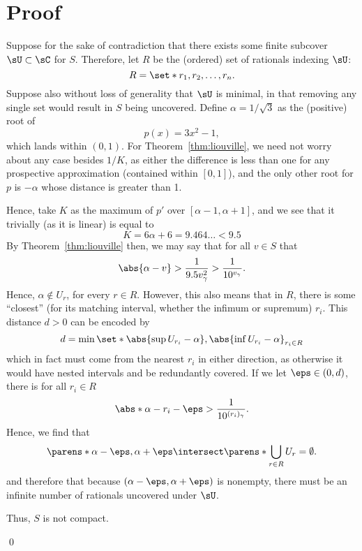 \documentclass{article}
\newcommand{\Rt}[1]{\dfrac{1}{10^{#1}}}
\begin{document}
\section{Proof}

Suppose for the sake of contradiction that there exists some finite subcover $\sU \subset \sC$ for $S$.
Therefore, let $R$ be the (ordered) set of rationals indexing $\sU$:
\[ R = \set*{r_{1}, r_{2}, \ldots, r_{n}}. \]
Suppose also without loss of generality that $\sU$ is minimal, in that removing any single set would result in $S$
being uncovered.
Define $\alpha = 1/\!\sqrt{3}$ as the (positive) root of
\[ p(x) = 3x^{2} - 1, \]
which lands within $(0, 1)$.
For Theorem~\ref{thm:liouville}, we need not worry about any case besides $1/K$, as
either the difference is less than one for any prospective approximation (contained within $[0, 1]$),
and the only other root for $p$ is $-\alpha$ whose distance is greater than 1.

Hence, take $K$ as the maximum of $p'$ over $[\alpha - 1, \alpha + 1]$, and we see that it trivially (as it is linear)
is equal to
\[ K = 6\alpha + 6 = 9.464\ldots < 9.5 \]
By Theorem~\ref{thm:liouville} then, we may say that for all $v \in S$ that
\[ \abs{\alpha - v} > \frac{1}{9.5v_{\gamma}^{2}} > \frac{1}{10^{v_{\gamma}}}. \]
Hence, $\alpha \notin U_{r}$, for every $r \in R$.
However, this also means that in $R$, there is some ``closest''
(for its matching interval, whether the infimum or supremum) $r_{i}$.
This distance $d > 0$ can be encoded by
\[
  d = \min\set*{\abs{\sup U_{r_{i}} - \alpha}, \abs{\inf U_{r_{i}} - \alpha}}_{r_{i} \in R}
\]
which in fact must come from the nearest $r_{i}$ in either direction, as otherwise it would
have nested intervals and be redundantly covered.
If we let $\eps \in (0, d)$, there is for all $r_{i} \in R$
\[
  \abs*{\alpha - r_{i}} - \eps > \Rt{(r_{i})_{\gamma}}.
\]
Hence, we find that
\[
  \parens*{\alpha - \eps, \alpha + \eps} \intersect \parens*{\bigcup_{r \in R}U_{r}} = \emptyset.
\]
and therefore that because $(\alpha - \eps, \alpha + \eps)$ is nonempty,
there must be an infinite number of rationals uncovered under $\sU$.

Thus, $S$ is not compact.

\qed{}

\end{document}
